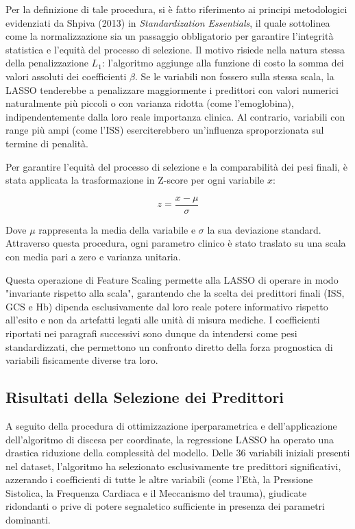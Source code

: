 \documentclass[11pt, oneside, noexaminfo]{sapthesis}   	%
\begin{document}
Per la definizione di tale procedura, si è fatto riferimento ai principi metodologici evidenziati da Shpiva (2013) in \textit{Standardization Essentials}, il quale sottolinea come la normalizzazione sia un passaggio obbligatorio per garantire l'integrità statistica e l'equità del processo di selezione. Il motivo risiede nella natura stessa della penalizzazione $L_1$: l'algoritmo aggiunge alla funzione di costo la somma dei valori assoluti dei coefficienti $\beta$. Se le variabili non fossero sulla stessa scala, la LASSO tenderebbe a penalizzare maggiormente i predittori con valori numerici naturalmente più piccoli o con varianza ridotta (come l'emoglobina), indipendentemente dalla loro reale importanza clinica. Al contrario, variabili con range più ampi (come l'ISS) eserciterebbero un'influenza sproporzionata sul termine di penalità.

Per garantire l'equità del processo di selezione e la comparabilità dei pesi finali, è stata applicata la trasformazione in Z-score per ogni variabile $x$:

\begin{equation}
z = \frac{x - \mu}{\sigma}
\end{equation}

Dove $\mu$ rappresenta la media della variabile e $\sigma$ la sua deviazione standard. Attraverso questa procedura, ogni parametro clinico è stato traslato su una scala con media pari a zero e varianza unitaria.

Questa operazione di Feature Scaling permette alla LASSO di operare in modo "invariante rispetto alla scala", garantendo che la scelta dei predittori finali (ISS, GCS e Hb) dipenda esclusivamente dal loro reale potere informativo rispetto all'esito e non da artefatti legati alle unità di misura mediche. I coefficienti riportati nei paragrafi successivi sono dunque da intendersi come pesi standardizzati, che permettono un confronto diretto della forza prognostica di variabili fisicamente diverse tra loro.\\

\subsection{Risultati della Selezione dei Predittori}
A seguito della procedura di ottimizzazione iperparametrica e dell'applicazione dell'algoritmo di discesa per coordinate, la regressione LASSO ha operato una drastica riduzione della complessità del modello. Delle 36 variabili iniziali presenti nel dataset, l'algoritmo ha selezionato esclusivamente tre predittori significativi, azzerando i coefficienti di tutte le altre variabili (come l'Età, la Pressione Sistolica, la Frequenza Cardiaca e il Meccanismo del trauma), giudicate ridondanti o prive di potere segnaletico sufficiente in presenza dei parametri dominanti.
\end{document}
